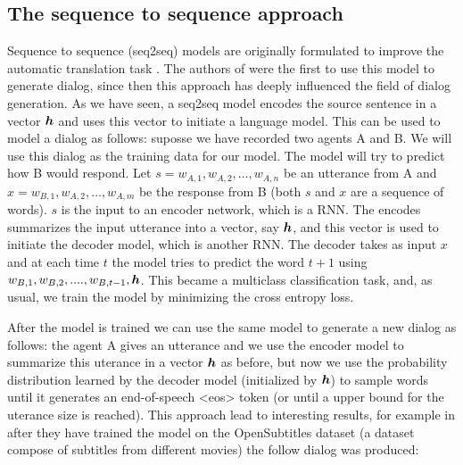 \subsection{The sequence to sequence approach}

Sequence to sequence (seq2seq) models are originally formulated to improve the automatic translation task \cite{Sustskever}. The authors of \cite{DBLP:journals/corr/VinyalsL15} were the first to use this model to generate dialog, since then this approach has deeply influenced the field of dialog generation. As we have seen, a seq2seq model encodes the source sentence in a vector $\bm{h}$ and uses this vector to initiate a language model. This can be used to model a dialog as follows: suposse we have recorded two agents A and B. We will use this dialog as the training data for our model. The model will try to predict how B would respond. Let $s = w_{A,1}, w_{A,2}, \dots, w_{A,n}$ be an utterance from A and  $x = w_{B,1}, w_{A,2}, \dots, w_{A,m}$ be the response from B (both $s$ and $x$ are a sequence of words). $s$ is the input to an encoder network, which is a RNN. The encodes summarizes the input utterance into a vector, say $\bm{h}$, and this vector is used to initiate the decoder model, which is another RNN. The decoder takes as input $x$ and at each time $t$ the model tries to predict the word $t+1$ using $w_{B,1}, w_{B,2}, ...., w_{B,t-1}, \bm{h}$. This became a multiclass classification task, and, as usual, we train the model by minimizing the cross entropy loss.


After the model is trained we can use the same model to generate a new dialog as follows: the agent A gives an utterance and we use the encoder model to summarize this uterance in a vector $\bm{h}$ as before, but now we use the probability distribution learned by the decoder model (initialized by $\bm{h}$) to sample words until it generates an end-of-speech <eos> token (or until a upper bound for the uterance size is reached). This approach lead to interesting results, for example in \cite{DBLP:journals/corr/VinyalsL15} after they have trained the model on the OpenSubtitles dataset (a dataset compose of subtitles from different movies) the follow dialog was produced:

